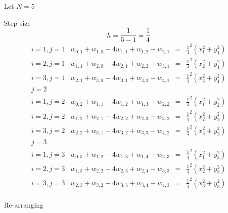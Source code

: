 Let $N=5$

Step-size
\[h=\frac{1}{5-1}=\frac{1}{4}\]
\[\begin{array}{l|rcl}
i=1,j=1&w_{0,1}+w_{1,0}-4w_{1,1}+w_{1,2}+w_{2,1}&=&\frac{1}{4}^2(x_1^2+y_1^2)\\
i=2,j=1&w_{1,1}+w_{2,0}-4w_{2,1}+w_{2,2}+w_{3,1}&=&\frac{1}{4}^2(x_2^2+y_1^2)\\
i=3,j=1&w_{2,1}+w_{3,0}-4w_{3,1}+w_{3,2}+w_{4,1}&=&\frac{1}{4}^2(x_3^2+y_1^2)\\
j=2\\
i=1,j=2&w_{0,2}+w_{1,1}-4w_{1,2}+w_{1,3}+w_{2,2}&=&\frac{1}{4}^2(x_1^2+y_2^2)\\
i=2,j=2&w_{1,2}+w_{2,1}-4w_{2,2}+w_{2,3}+w_{3,2}&=&\frac{1}{4}^2(x_2^2+y_2^2)\\
i=3,j=2&w_{2,2}+w_{3,1}-4w_{3,2}+w_{3,3}+w_{4,2}&=&\frac{1}{4}^2(x_3^2+y_2^2)\\
j=3\\
i=1,j=3&w_{0,3}+w_{1,2}-4w_{1,3}+w_{1,4}+w_{2,3}&=&\frac{1}{4}^2(x_1^2+y_3^2)\\
i=2,j=3&w_{1,3}+w_{2,2}-4w_{2,3}+w_{2,4}+w_{3,3}&=&\frac{1}{4}^2(x_2^2+y_3^2)\\
i=3,j=3&w_{2,3}+w_{3,2}-4w_{3,3}+w_{3,4}+w_{4,3}&=&\frac{1}{4}^2(x_3^2+y_3^2)\\
\end{array}
\]	

Re-arranging


